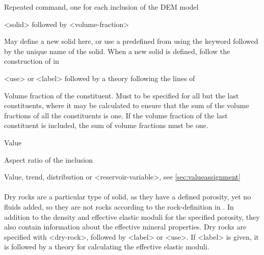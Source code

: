 {
 \slist
   \item \Description Repeated command, one for each inclusion of the DEM model
   \item \Argument <solid> followed by <volume-fraction>
   \item \Default
 \elist

 \slist
   \item \Description May define a new solid here, or use a predefined  from  using the keyword  followed by the unique name of the solid. When a new solid is defined, follow the construction of  in 
   \item \Argument <use> or <label> followed by a theory following the lines of 
   \item \Default
 \elist

 \slist
   \item \Description Volume fraction of the constituent. Must to be specified for all but the last constituents, where it may be calculated to ensure that the sum of the volume fractions of all the constituents is one. If the volume fraction of the last constituent is included, the sum of volume fractions must be one. 
   \item \Argument Value
   \item \Default
 \elist

 \slist
   \item \Description Aspect ratio of the inclusion
   \item \Argument Value, trend, distribution or <reservoir-variable>, see \autoref{sec:valueassignment}
   \item \Default
 \elist

\paragraph{}
 \slist
   \item \Description Dry rocks are a particular type of solid, as they have a defined porosity, yet no fluids added, so they are not rocks according to the rock-definition in . In addition to the density and effective elastic moduli for the specified porosity, they also contain information about the effective mineral properties. 
Dry rocks are specified with <dry-rock>, followed by <label> or <use>. If <label> is given, it is followed by a theory for calculating the effective elastic moduli.
   \item \Argument 
   \item \Default 
 \elist

}
